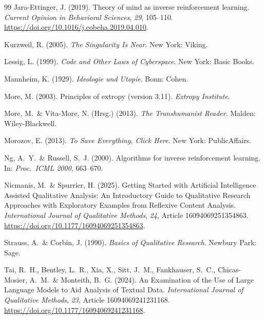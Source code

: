 \documentclass[12pt,a4paper]{article}
\begin{document}
\begin{thebibliography}{99}
  Jara-Ettinger, J. (2019).
  Theory of mind as inverse reinforcement learning.
  \textit{Current Opinion in Behavioral Sciences}, \textit{29}, 105--110.
  \url{https://doi.org/10.1016/j.cobeha.2019.04.010}.

  Kurzweil, R. (2005).
  \textit{The Singularity Is Near}.
  New York: Viking.

  Lessig, L. (1999).
  \textit{Code and Other Laws of Cyberspace}.
  New York: Basic Books.

  Mannheim, K. (1929).
  \textit{Ideologie und Utopie}.
  Bonn: Cohen.

  More, M. (2003).
  Principles of extropy (version 3.11).
  \textit{Extropy Institute}.

  More, M.~\& Vita-More, N. (Hrsg.) (2013).
  \textit{The Transhumanist Reader}.
  Malden: Wiley-Blackwell.

  Morozov, E. (2013).
  \textit{To Save Everything, Click Here}.
  New York: PublicAffairs.

  Ng, A.~Y.~\& Russell, S.~J. (2000).
  Algorithms for inverse reinforcement learning.
  In: \textit{Proc.\ ICML 2000}, 663--670.

  Nicmanis, M.~\& Spurrier, H. (2025).
  Getting Started with Artificial Intelligence Assisted Qualitative Analysis: An Introductory Guide to Qualitative Research Approaches with Exploratory Examples from Reflexive Content Analysis.
  \textit{International Journal of Qualitative Methods}, \textit{24}, Article 16094069251354863.
  \url{https://doi.org/10.1177/16094069251354863}.

  Strauss, A.~\& Corbin, J. (1990).
  \textit{Basics of Qualitative Research}.
  Newbury Park: Sage.

  Tai, R.~H., Bentley, L.~R., Xia, X., Sitt, J.~M., Fankhauser, S.~C., Chicas-Mosier, A.~M.~\& Monteith, B.~G. (2024).
  An Examination of the Use of Large Language Models to Aid Analysis of Textual Data.
  \textit{International Journal of Qualitative Methods}, \textit{23}, Article 16094069241231168.
  \url{https://doi.org/10.1177/16094069241231168}.


\end{thebibliography}
\end{document}

